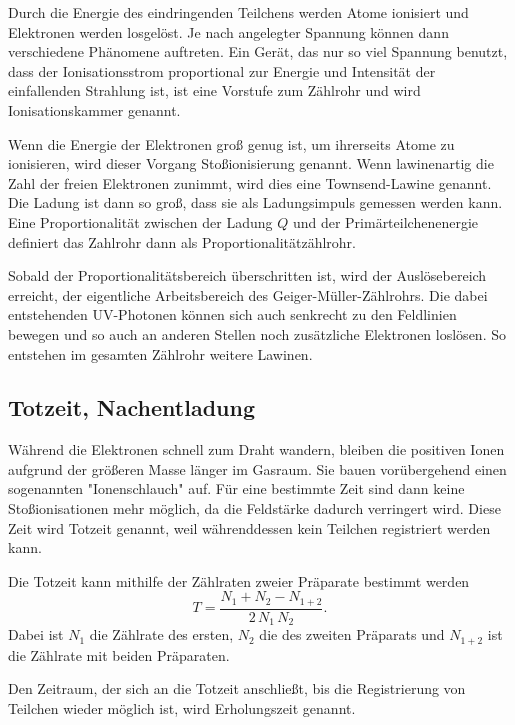 \noindent Durch die Energie des eindringenden Teilchens werden Atome ionisiert und Elektronen werden losgelöst. Je nach angelegter Spannung können dann verschiedene Phänomene auftreten. Ein Gerät, das nur so viel Spannung benutzt, dass der Ionisationsstrom proportional zur Energie und Intensität der einfallenden Strahlung ist, ist eine Vorstufe zum Zählrohr und wird Ionisationskammer genannt. 

\noindent Wenn die Energie der Elektronen groß genug ist, um ihrerseits Atome zu ionisieren, wird dieser Vorgang Stoßionisierung genannt. Wenn lawinenartig die Zahl der freien Elektronen zunimmt, wird dies eine Townsend-Lawine genannt. 
Die Ladung ist dann so groß, dass sie als Ladungsimpuls gemessen werden kann.
Eine Proportionalität zwischen der Ladung $Q$ und der Primärteilchenenergie definiert das Zahlrohr dann als Proportionalitätzählrohr. 

\noindent Sobald der Proportionalitätsbereich überschritten ist, wird der Auslösebereich erreicht, der eigentliche Arbeitsbereich des Geiger-Müller-Zählrohrs. Die dabei entstehenden UV-Photonen können sich auch senkrecht zu den Feldlinien bewegen und so auch an anderen Stellen noch zusätzliche Elektronen loslösen. So entstehen im gesamten Zählrohr weitere Lawinen. 

\subsection{Totzeit, Nachentladung}
Während die Elektronen schnell zum Draht wandern, bleiben die positiven Ionen aufgrund der größeren Masse länger im Gasraum. Sie bauen vorübergehend einen sogenannten "Ionenschlauch" auf. Für eine bestimmte Zeit sind dann keine Stoßionisationen mehr möglich, da die Feldstärke dadurch verringert wird. Diese Zeit wird Totzeit genannt, weil währenddessen kein Teilchen registriert werden kann.

\noindent Die Totzeit kann mithilfe der Zählraten zweier Präparate bestimmt werden
\begin{equation}
    T = \frac{N_1 + N_2 - N_{1+2}}{2 \, N_1 \, N_2}.
    \label{totzeit}
\end{equation}
Dabei ist $N_1$ die Zählrate des ersten, $N_2$ die des zweiten Präparats und $N_{1+2}$ ist die Zählrate mit beiden Präparaten.

\noindent Den Zeitraum, der sich an die Totzeit anschließt, bis die Registrierung von Teilchen wieder möglich ist, wird Erholungszeit genannt.

